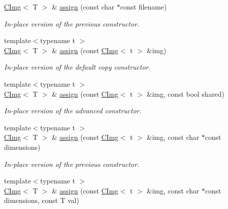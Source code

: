 \begin{DoxyCompactItemize}
\item 
\hyperlink{structcimg__library_1_1CImg}{CImg}$<$ T $>$ \& \hyperlink{structcimg__library_1_1CImg_a78c78d152f5012d2e8fdcc35235c62a4}{assign} (const char $\ast$const filename)
\begin{DoxyCompactList}\small\item\em In-\/place version of the previous constructor. \item\end{DoxyCompactList}\item 
{\footnotesize template$<$typename t $>$ }\\\hyperlink{structcimg__library_1_1CImg}{CImg}$<$ T $>$ \& \hyperlink{structcimg__library_1_1CImg_a0fb4ca12616b7a1a05a9b3cc62878df4}{assign} (const \hyperlink{structcimg__library_1_1CImg}{CImg}$<$ t $>$ \&img)
\begin{DoxyCompactList}\small\item\em In-\/place version of the default copy constructor. \item\end{DoxyCompactList}\item 
{\footnotesize template$<$typename t $>$ }\\\hyperlink{structcimg__library_1_1CImg}{CImg}$<$ T $>$ \& \hyperlink{structcimg__library_1_1CImg_a934bab7595fd98de5131d5d2394e4a81}{assign} (const \hyperlink{structcimg__library_1_1CImg}{CImg}$<$ t $>$ \&img, const bool shared)
\begin{DoxyCompactList}\small\item\em In-\/place version of the advanced constructor. \item\end{DoxyCompactList}\item 
\hypertarget{structcimg__library_1_1CImg_aa5a08c14d01a530e5bc9549db77144f7}{
{\footnotesize template$<$typename t $>$ }\\\hyperlink{structcimg__library_1_1CImg}{CImg}$<$ T $>$ \& \hyperlink{structcimg__library_1_1CImg_aa5a08c14d01a530e5bc9549db77144f7}{assign} (const \hyperlink{structcimg__library_1_1CImg}{CImg}$<$ t $>$ \&img, const char $\ast$const dimensions)}
\label{structcimg__library_1_1CImg_aa5a08c14d01a530e5bc9549db77144f7}

\begin{DoxyCompactList}\small\item\em In-\/place version of the previous constructor. \item\end{DoxyCompactList}\item 
\hypertarget{structcimg__library_1_1CImg_a42e17fa9823170992210022cc0646684}{
{\footnotesize template$<$typename t $>$ }\\\hyperlink{structcimg__library_1_1CImg}{CImg}$<$ T $>$ \& \hyperlink{structcimg__library_1_1CImg_a42e17fa9823170992210022cc0646684}{assign} (const \hyperlink{structcimg__library_1_1CImg}{CImg}$<$ t $>$ \&img, const char $\ast$const dimensions, const T val)}
\label{structcimg__library_1_1CImg_a42e17fa9823170992210022cc0646684}


\end{DoxyCompactItemize}
